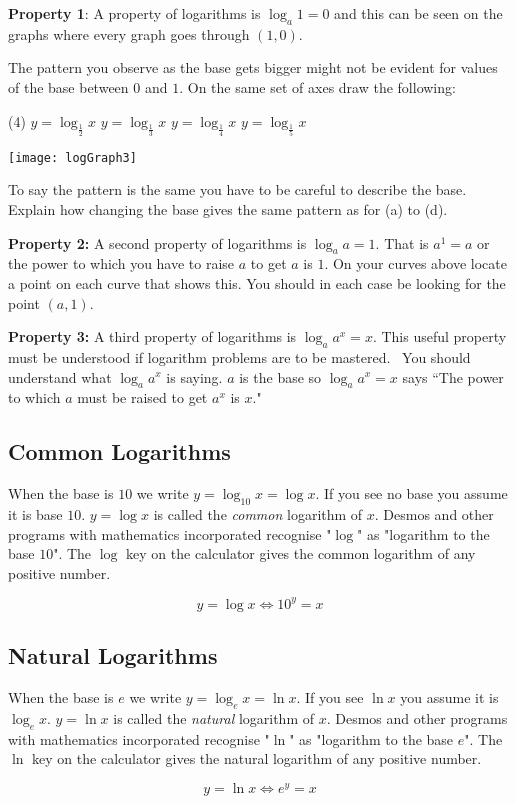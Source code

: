 \textbf{Property 1}: A property of logarithms is $\log _{a} 1 =0$ and this can be seen on the graphs where every graph goes through $\left (1 ,0\right )$. 

The pattern you observe as the base gets bigger might not be evident for values of the base between $0$ and $1$. On the same set of axes draw the following: 

\begin{tasks}(4)
	\task $y =\log _{\frac{1}{2}} x$ 
\task $y =\log _{\frac{1}{3}} x$ 
	\task $y =\log _{\frac{1}{4}} x$ 
	\task $y =\log _{\frac{1}{5}} x$ \end{tasks}
\begin{center}\texttt{[image: logGraph3]}\end{center}
To say the pattern is the same you have to be careful to describe the base. Explain how changing the base gives the same pattern as for (a) to (d).

\textbf{Property 2:} A second property of logarithms is $\log _{a} a =1$. That is $a^{1} =a$ or the power to which you have to raise $a$ to get $a$ is $1$. On your curves above locate a point on each curve that shows this. You
should in each case be looking for the point $\left (a ,1\right )$. 

\textbf{Property 3:} A third property
of logarithms is $\log _{a} a^{x} =x$. This useful property must be understood if logarithm problems are to be mastered.
\ You should understand what $\log _{a} a^{x}$ is saying. $a$ is the base so $\log _{a} a^{x} =x$ says ``The power to which $a$ must be raised to get $a^{x}$ is $x$." 

\subsection*{Common Logarithms}
When the base is $10$ we write $y =\log _{10} x =\log  x$. If you see no base you assume it is base $10$. $y =\log  x$ is called the \emph{common} logarithm of $x$. Desmos and other programs with mathematics incorporated recognise "$\log $" as "logarithm to the base $10$". The $\log $ key on the calculator gives the common logarithm of any positive number.
\begin{tcolorbox}
\begin{equation*}y =\log  x \Leftrightarrow 10^{y} =x
\end{equation*}
\end{tcolorbox}


\subsection*{Natural Logarithms}
When the base is $e$ we write $y =\log _{e} x =\ln  x$. If you see $\ln  x$ you assume it is $\log _{e} x$. $y =\ln  x$ is called the \emph{natural} logarithm of $x$. Desmos and other programs with mathematics incorporated recognise "$\ln $" as "logarithm to the base $e$". The $\ln $ key on the calculator gives the natural logarithm of any positive number.
\begin{tcolorbox}\begin{equation*}y =\ln  x \Leftrightarrow e^{y} =x
\end{equation*}\end{tcolorbox}


